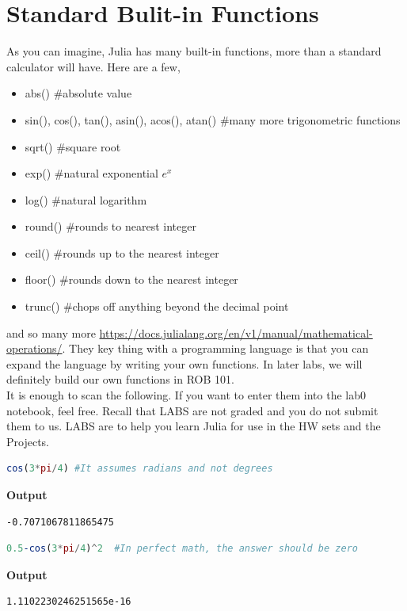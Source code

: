 \section{Standard Bulit-in Functions}

As you can imagine, Julia has many built-in functions, more than a standard calculator will have. Here are a few,
\begin{itemize}
\item abs() \#absolute value
\item sin(), cos(), tan(), asin(), acos(), atan()  \#many more trigonometric functions
\item sqrt() \#square root
\item exp()  \#natural exponential $e^x$
\item log() \#natural logarithm
\item round() \#rounds to nearest integer
\item ceil() \#rounds up to the nearest integer
\item floor() \#rounds down to the nearest integer
\item trunc() \#chops off anything beyond the decimal point
\end{itemize}
and so many more \url{https://docs.julialang.org/en/v1/manual/mathematical-operations/}. They key thing with a programming language is that you can expand the language by writing your own functions. In later labs, we will definitely build our own functions in ROB 101. \\

It is enough to scan the following. If you want to enter them into the lab0 notebook, feel free. Recall that LABS are not graded and you do not submit them to us. LABS are to help you learn Julia for use in the HW sets and the Projects.\\


\begin{lstlisting}[language=Julia,style=mystyle]
cos(3*pi/4) #It assumes radians and not degrees
\end{lstlisting}
\textbf{Output} 
\begin{verbatim}
-0.7071067811865475
\end{verbatim}

\begin{lstlisting}[language=Julia,style=mystyle]
0.5-cos(3*pi/4)^2  #In perfect math, the answer should be zero
\end{lstlisting}
\textbf{Output} 
\begin{verbatim}
1.1102230246251565e-16
\end{verbatim}


